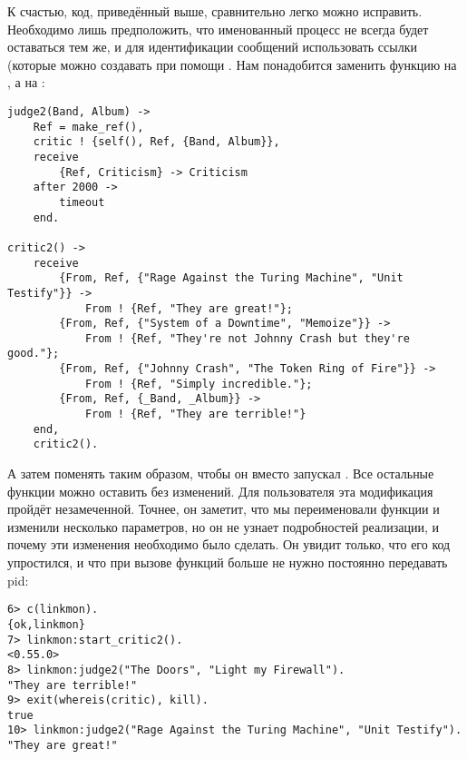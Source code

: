 К счастью, код, приведённый выше, сравнительно легко можно исправить.
Необходимо лишь предположить, что именованный процесс не всегда будет оставаться тем же, и для идентификации сообщений использовать ссылки (которые можно создавать при помощи .
Нам понадобится заменить функцию  на , а  на :
\begin{lstlisting}[style=erlang]
judge2(Band, Album) ->
    Ref = make_ref(),
    critic ! {self(), Ref, {Band, Album}},
    receive
        {Ref, Criticism} -> Criticism
    after 2000 ->
        timeout
    end.
 
critic2() ->
    receive
        {From, Ref, {"Rage Against the Turing Machine", "Unit Testify"}} ->
            From ! {Ref, "They are great!"};
        {From, Ref, {"System of a Downtime", "Memoize"}} ->
            From ! {Ref, "They're not Johnny Crash but they're good."};
        {From, Ref, {"Johnny Crash", "The Token Ring of Fire"}} ->
            From ! {Ref, "Simply incredible."};
        {From, Ref, {_Band, _Album}} ->
            From ! {Ref, "They are terrible!"}
    end,
    critic2().
\end{lstlisting}

А затем поменять  таким образом, чтобы он вместо  запускал .
Все остальные функции можно оставить без изменений.
Для пользователя эта модификация пройдёт незамеченной.
Точнее, он заметит, что мы переименовали функции и изменили несколько параметров, но он не узнает подробностей реализации, и почему эти изменения необходимо было сделать.
Он увидит только, что его код упростился, и что при вызове функций больше не нужно постоянно передавать pid:
\begin{lstlisting}[style=erlang]
6> c(linkmon).
{ok,linkmon}
7> linkmon:start_critic2().
<0.55.0>
8> linkmon:judge2("The Doors", "Light my Firewall").
"They are terrible!"
9> exit(whereis(critic), kill).
true
10> linkmon:judge2("Rage Against the Turing Machine", "Unit Testify").    
"They are great!"
\end{lstlisting}

